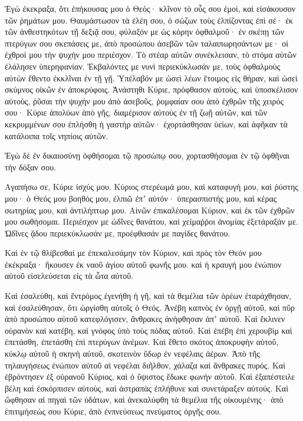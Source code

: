 \begin{spacing}{1.1}
\begin{multicols}{2}
Ἐγὼ ἐκεκραξα, ὅτι ἐπήκουσας μου ὁ Θεός· κλῖνον τὸ οὖς σου ἐμοὶ, καὶ εἰσάκουσον τῶν ῥημάτων μου.
Θαυμάστωσον τὰ ἐλέη σου, ὁ σώζων τοὺς ἐλπίζοντας ἐπὶ σέ· ἐκ τῶν ἀνθεστηκότων τῇ δεξιᾷ σου,
φύλαξόν με ὡς κόρην ὀφθαλμοῦ· ἐν σκέπῃ τῶν πτερύγων σου σκεπάσεις με,
ἀπὸ προσώπου ἀσεβῶν τῶν ταλαιπωρησάντων με· οἱ ἐχθροί μου τὴν ψυχήν μου περιέσχον.
Τὸ στέαρ αὐτῶν συνέκλεισαν, τὸ στόμα αὐτῶν ἐλάλησεν ὑπερηφανίαν.
Ἐκβαλόντες με νυνὶ περιεκύκλωσάν με, τοὺς ὀφθαλμοὺς αὐτὼν ἔθεντο ἐκκλῖναι ἐν τῇ γῇ.
Ὑπέλαβόν με ὡσεὶ λέων ἕτοιμος εἰς θήραν, καὶ ὡσεὶ σκύμνος οἰκῶν ἐν ἀποκρύφοις.
Ἀνάστηθι Κύριε, πρόφθασον αὐτοὺς, καὶ ὑποσκέλισον αὐτοὺς, ῥῦσαι τὴν ψυχήν μου ἀπὸ ἀσεβοῦς, ῥομφαίαν σου
ἀπὸ ἐχθρῶν τῆς χειρός σου· Κύριε ἀπολύων ἀπὸ γῆς, διαμέρισον αὐτοὺς ἐν τῇ ζωῇ αὐτῶν, καὶ τῶν κεκρυμμένων σου ἐπλήσθη ἡ γαστὴρ αὐτῶν· ἐχορτάσθησαν ὑείων, καὶ ἀφῆκαν τὰ κατάλοιπα τοῖς νηπίοις αὐτῶν.

Ἐγὼ δὲ ἐν δικαιοσύνῃ ὀφθήσομαι τῷ προσώπῳ σου, χορτασθήσομαι ἐν τῷ ὀφθῆναι τὴν δόξαν σου.

Αγαπήσω σε, Κύριε ἰσχύς μου.
Κύριος στερέωμά μου, καὶ καταφυγή μου, καὶ ῥύστης μου· ὁ Θεός μου βοηθός μου, ἐλπιῶ ἐπʼ αὐτόν· ὑπερασπιστής μου, καὶ κέρας σωτηρίας μου, καὶ ἀντιλήπτωρ μου.
Αἰνῶν ἐπικαλέσομαι Κύριον, καὶ ἐκ τῶν ἐχθρῶν μου σωθήσομαι.
Περιέσχον με ὠδῖνες θανάτου, καὶ χείμαῤῥοι ἀνομίας ἐξετάραξάν με.
Ὠδῖνες ᾅδου περιεκύκλωσάν με, προέφθασάν με παγίδες θανάτου.

Καὶ ἐν τῷ θλίβεσθαί με ἐπεκαλεσάμην τὸν Κύριον, καὶ πρὸς τὸν Θεόν μου ἐκέκραξα· ἤκουσεν ἐκ ναοῦ ἁγίου αὐτοῦ φωνῆς μου. καὶ ἡ κραυγή μου ἐνώπιον αὐτοῦ εἰσελεύσεται εἰς τὰ ὦτα αὐτοῦ.

Καὶ ἐσαλεύθη, καὶ ἔντρόμος ἐγενήθη ἡ γῆ, καὶ τὰ θεμέλια τῶν ὀρέων ἐταράχθησαν, καὶ ἐσαλεύθησαν, ὅτι ὠργίσθη αὐτοῖς ὁ Θεός.
Ἀνέβη καπνὸς ἐν ὀργῇ αὐτοῦ, καὶ πῦρ ἀπὸ προσώπου αὐτοῦ κατεφλόγισεν, ἄνθρακες ἀνήφθησαν ἀπʼ αὐτοῦ.
Καὶ ἔκλινεν οὐρανὸν καὶ κατέβη, καὶ γνόφος ὑπὸ τοὺς πόδας αὐτοῦ.
Καὶ ἐπέβη ἐπὶ χερουβὶμ καὶ ἐπετάσθη, ἐπετάσθη ἐπὶ πτερύγων ἀνέμων.
Καὶ ἔθετο σκότος ἀποκρυφὴν αὐτοῦ, κύκλῳ αὐτοῦ ἡ σκηνὴ αὐτοῦ, σκοτεινὸν ὕδωρ ἐν νεφέλαις ἀέρων.
Ἀπὸ τῆς τηλαυγήσεως ἐνώπιον αὐτοῦ αἱ νεφέλαι διῆλθον, χάλαζα καὶ ἄνθρακες πυρός.
Καὶ ἐβρόντησεν ἐξ οὐρανοῦ Κύριος, καὶ ὁ ὕψιστος ἔδωκε φωνὴν αὐτοῦ.
Καὶ ἐξαπέστειλε βέλη καὶ ἐσκόρπισεν αὐτοὺς, καὶ ἀστραπὰς ἐπλήθυνε καὶ συνετάραξεν αὐτούς.
Καὶ ὤφθησαν αἱ πηγαὶ τῶν ὑδάτων, καὶ ἀνεκαλύφθη τὰ θεμέλια τῆς οἰκουμένης· ἀπὸ ἐπιτιμήσεώς σου Κύριε, ἀπὸ ἐνπνεύσεως πνεύματος ὀργῆς σου.


\end{multicols}
\end{spacing}
